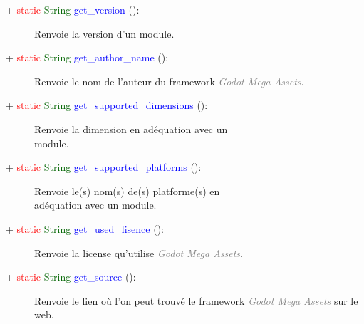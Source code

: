 \documentclass[a4paper, 11pt]{article}
\begin{document}
	\begin{description}
		\item [+ \textcolor{red}{static} \textcolor{darkgreen}{String} \textcolor{blue}{get\_version} ():] 
		Renvoie la version d'un module.\\
	\end{description}
	\begin{description}
		\item [+ \textcolor{red}{static} \textcolor{darkgreen}{String} \textcolor{blue}{get\_author\_name} 
		():] Renvoie le nom de l'auteur du framework \textcolor{gray}{\textit{Godot Mega Assets}}.\\
	\end{description}
	\begin{description}
		\item [+ \textcolor{red}{static} \textcolor{darkgreen}{String} \textcolor{blue}
		{get\_supported\_dimensions} ():] Renvoie la dimension en adéquation avec un \\module.\\
	\end{description}
	\begin{description}
		\item [+ \textcolor{red}{static} \textcolor{darkgreen}{String} \textcolor{blue}
		{get\_supported\_platforms} ():] Renvoie le(s) nom(s) de(s) platforme(s) en \\adéquation avec un
		module.\\
	\end{description}
	\begin{description}
		\item [+ \textcolor{red}{static} \textcolor{darkgreen}{String} \textcolor{blue}{get\_used\_lisence} 
		():] Renvoie la license qu'utilise \textcolor{gray}{\textit{Godot Mega Assets}}.\\
	\end{description}
	\begin{description}
		\item [+ \textcolor{red}{static} \textcolor{darkgreen}{String} \textcolor{blue}{get\_source} ():]
		Renvoie le lien où l'on peut trouvé le framework \textit{\textcolor{gray}{Godot Mega Assets}} sur le 
		web.\\
	\end{description}
\end{document}
